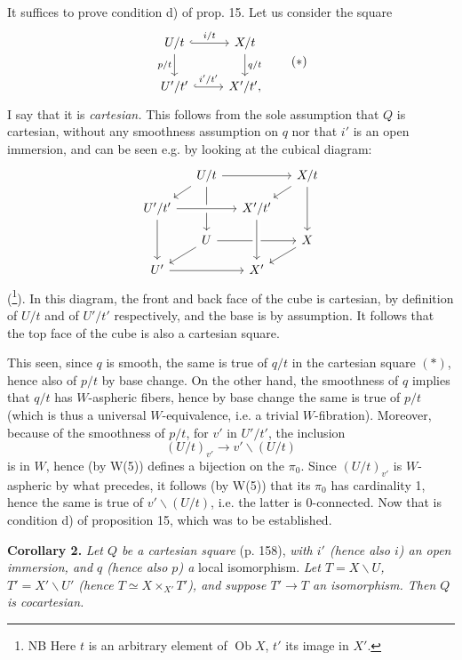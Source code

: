 \documentclass[11pt]{article}
\newcommand{\printedpage}[1]{\marginpar{\footnotesize p.~#1}}
\newcommand{\msp}[1]{\marginpar{\footnotesize [#1]}}
\newcommand{\Ob}{\operatorname{Ob}}
\begin{document}
It suffices to prove condition d) of prop. 15. Let us consider the square
\[
\begin{tikzcd}
U/t \ar[r, hook, "i/t"] \ar[d, "p/t"'] & X/t \ar[d, "q/t"] \\
U'/t' \ar[r, hook, "i'/t'"] & X'/t',
\end{tikzcd}
\tag*{$(*)$}
\]
I say that it is \textit{cartesian.} This follows from the sole assumption that $Q$ is cartesian, without any smoothness assumption on $q$ nor that $i'$ is an open immersion, and can be seen e.g. by looking at the cubical diagram:
\printedpage{110}
\[
\begin{tikzcd}[row sep=small, column sep=small]
& U/t \ar[rr] \ar[dl] \ar[dd] & & X/t \ar[dl] \ar[dd] \\
U'/t' \ar[rr, crossing over] \ar[dd] & & X'/t' & \\
& U \ar[rr] \ar[dl] & & X \ar[dl] \\
U' \ar[rr] & & X' \ar[from=uu, crossing over] &
\end{tikzcd}
\]
(\footnote[110]{NB Here $t$ is an arbitrary element of $\Ob X$, $t'$ its image in $X'$.}). In this diagram, the front and back face of the cube is cartesian, by definition of $U/t$ and of $U'/t'$
\msp{page 160}
respectively, and the base is by assumption. It follows that the top face of the cube is also a cartesian square.

This seen, since $q$ is smooth, the same is true of $q/t$ in the cartesian square $(*)$, hence also of $p/t$ by base change. On the other hand, the smoothness of $q$ implies that $q/t$ has $W$-aspheric fibers, hence by base change the same is true of $p/t$ (which is thus a universal $W$-equivalence, i.e. a trivial $W$-fibration). Moreover, because of the smoothness of $p/t$, for $v'$ in $U'/t'$, the inclusion %
\[
(U/t)_{v'} \longrightarrow v' \backslash (U/t)
\]
is in $W$, hence (by W(5)) defines a bijection on the $\pi_0$. Since $(U/t)_{v'}$ is $W$-aspheric by what precedes, it follows (by W(5)) that its $\pi_0$ has cardinality 1, hence the same is true of $v' \backslash (U/t)$, i.e. the latter is 0-connected. Now that is condition d) of proposition 15, which was to be established.

\msp{page 161}
\textbf{Corollary 2.} \textit{Let $Q$ be a cartesian square} (p. 158), \textit{with $i'$ (hence also $i$) an open immersion, and $q$ (hence also $p$) a} local isomorphism. \textit{Let $T = X \backslash U$, $T' = X' \backslash U'$ (hence $T \simeq X \times_{X'} T'$), and suppose $T' \longrightarrow T$ an isomorphism. Then $Q$ is cocartesian.}
\end{document}

